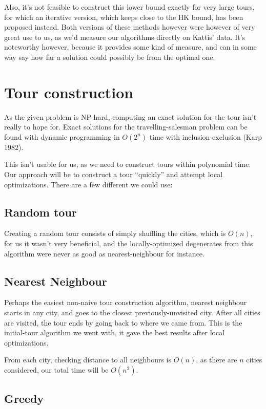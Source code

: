 \documentclass[a4paper,12pt,oneside]{article}
\begin{document}
Also, it's not feasible to construct this lower bound exactly for very large tours, for which an iterative version, which keeps close to the HK bound, has been proposed instead. Both versions of these methods however were however of very great use to us, as we'd measure our algorithms directly on Kattis' data. It's noteworthy however, because it provides some kind of measure, and can in some way say how far a solution could possibly be from the optimal one.

\section{Tour construction}

As the given problem is NP-hard, computing an exact solution for the tour isn't really to hope for. Exact solutions for the travelling-salesman problem can be found with dynamic programming in $O(2^n)$ time with inclusion-exclusion (Karp 1982).

This isn't usable for us, as we need to construct tours within polynomial time. Our approach will be to construct a tour ``quickly'' and attempt local optimizations. There are a few different we could use:

\subsection{Random tour}

Creating a random tour consists of simply shuffling the cities, which is $O(n)$, for us it wasn't very beneficial, and the locally-optimized degenerates from this algorithm were never as good as nearest-neighbour for instance. 

\subsection{Nearest Neighbour}

Perhaps the easiest non-naive tour construction algorithm, nearest neighbour starts in any city, and goes to the closest previously-unvisited city. After all cities are visited, the tour ends by going back to where we came from. This is the initial-tour algorithm we went with, it gave the best results after local optimizations.

From each city, checking distance to all neighbours is $O(n)$, as there are $n$ cities considered, our total time will be $O(n^2)$.

\subsection{Greedy}
\end{document}
